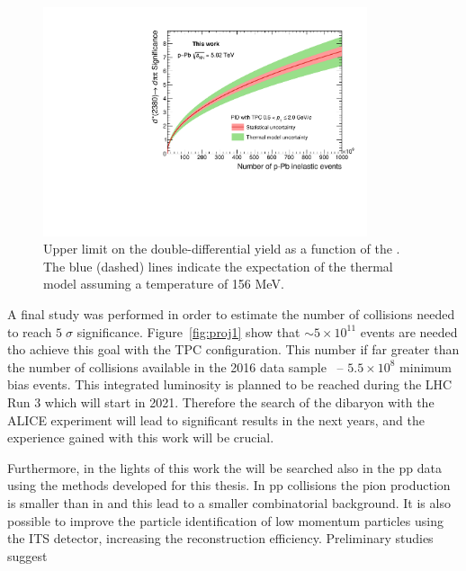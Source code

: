 \begin{figure} [htb]
    \centering
    \includegraphics[width=0.85\textwidth]{gfx/sig_TPC}
    \caption{Upper limit on the double-differential \ds yield as a function of the \pt. The blue (dashed) lines indicate the expectation of the thermal model assuming a temperature of 156 MeV.}
	\label{fig:UL}
\end{figure}

A final study was performed in order to estimate the number of \pPb collisions needed to reach 
$5\;\sigma$ significance.
Figure~\ref{fig:proj1} show that $\sim 5\times10^{11}$ events are needed tho achieve this goal with the
TPC configuration.
This number if far greater than the number of \pPb collisions available in the 2016 data sample
\ -- $5.5\times10^{8}$ minimum bias events.
This integrated luminosity is planned to be reached during the LHC Run 3 which will start in 2021.
Therefore the search of the \ds dibaryon with the ALICE experiment will lead to significant results
in the next years, and the experience gained with this work will be crucial.

Furthermore, in the lights of this work the \ds will be searched also in the pp data using
the methods developed for this thesis. In pp collisions the pion production is smaller than in \pPb
and this lead to a smaller combinatorial background. It is also possible to improve the
particle identification of low momentum particles using the ITS detector,
increasing the reconstruction efficiency.
Preliminary studies suggest 
